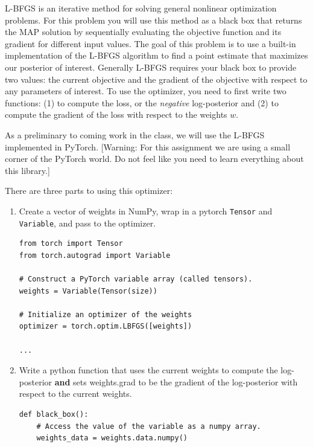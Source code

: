 \documentclass[submit]{harvardml}
\begin{document}
\begin{problem}[14pts]\label{prob:numerical_linear_model}
  L-BFGS is an iterative method for solving general nonlinear
  optimization problems. For this problem you will use this method as
  a black box that returns the MAP solution by sequentially evaluating
  the objective function and its gradient for different input
  values. The goal of this problem is to use a built-in implementation
  of the L-BFGS algorithm to find a point estimate that maximizes our
  posterior of interest. Generally L-BFGS requires your black box to
  provide two values: the current objective and the gradient of the
  objective with respect to any parameters of interest. To use the optimizer, you need to
first write two functions: (1) to compute the loss, or the
\textit{negative} log-posterior and (2) to compute the gradient of the
loss with respect to the weights $w$.

\smallskip

As a preliminary to coming work in the class, we will use the L-BFGS
implemented in PyTorch. [Warning: For this assignment we are using a
small corner of the PyTorch world. Do not feel like you need to learn
everything about this library.]

There are three parts to using this optimizer:

\begin{enumerate}
\item  Create a vector of weights in NumPy,  wrap in a pytorch \texttt{Tensor} and  \texttt{Variable},
and pass to the optimizer.
\begin{verbatim}
from torch import Tensor
from torch.autograd import Variable

# Construct a PyTorch variable array (called tensors).
weights = Variable(Tensor(size))

# Initialize an optimizer of the weights
optimizer = torch.optim.LBFGS([weights])

...
\end{verbatim}

\item Write a python function that uses the
current weights  to compute the log-posterior
\textbf{and} sets weights.grad to be the gradient of the log-posterior
with respect to the current weights.



\begin{verbatim}
def black_box():
    # Access the value of the variable as a numpy array.
    weights_data = weights.data.numpy()


\end{verbatim}
\end{enumerate}
\end{problem}
\end{document}
